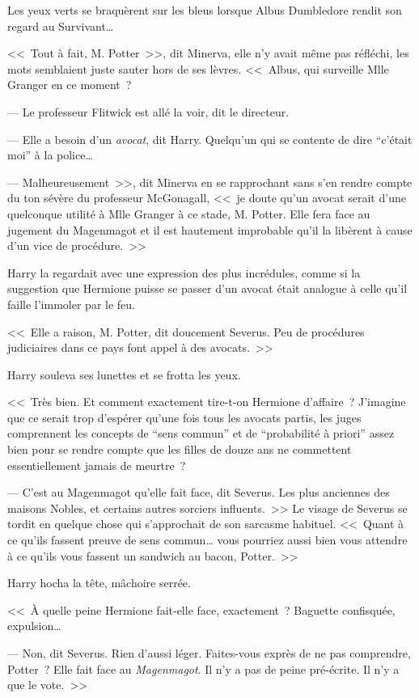 Les yeux verts se braquèrent sur les bleus lorsque Albus Dumbledore rendit son regard au Survivant…

<<~Tout à fait, M. Potter~>>, dit Minerva, elle n'y avait même pas réfléchi, les mots semblaient juste sauter hors de ses lèvres. <<~Albus, qui surveille Mlle Granger en ce moment~?

--- Le professeur Flitwick est allé la voir, dit le directeur.

--- Elle a besoin d'un \emph{avocat}, dit Harry. Quelqu'un qui se contente de dire “c'était moi” à la police…

--- Malheureusement~>>, dit Minerva en se rapprochant sans s'en rendre compte du ton sévère du professeur McGonagall, <<~je doute qu'un avocat serait d'une quelconque utilité à Mlle Granger à ce stade, M. Potter. Elle fera face au jugement du Magenmagot et il est hautement improbable qu'il la libèrent à cause d'un vice de procédure.~>>

Harry la regardait avec une expression des plus incrédules, comme si la suggestion que Hermione puisse se passer d'un avocat était analogue à celle qu'il faille l'immoler par le feu.

<<~Elle a raison, M. Potter, dit doucement Severus. Peu de procédures judiciaires dans ce pays font appel à des avocats.~>>

Harry souleva ses lunettes et se frotta les yeux.

<<~Très bien. Et comment exactement tire-t-on Hermione d'affaire~? J'imagine que ce serait trop d'espérer qu'une fois tous les avocats partis, les juges comprennent les concepts de “sens commun” et de “probabilité à priori” assez bien pour se rendre compte que les filles de douze ans ne commettent essentiellement jamais de meurtre~?

--- C'est au Magenmagot qu'elle fait face, dit Severus. Les plus anciennes des maisons Nobles, et certains autres sorciers influents.~>> Le visage de Severus se tordit en quelque chose qui s'approchait de son sarcasme habituel. <<~Quant à ce qu'ils fassent preuve de sens commun… vous pourriez aussi bien vous attendre à ce qu'ils vous fassent un sandwich au bacon, Potter.~>>

Harry hocha la tête, mâchoire serrée.

<<~À quelle peine Hermione fait-elle face, exactement~? Baguette confisquée, expulsion…

--- Non, dit Severus. Rien d'aussi léger. Faites-vous exprès de ne pas comprendre, Potter~? Elle fait face au \emph{Magenmagot}. Il n'y a pas de peine pré-écrite. Il n'y a que le vote.~>>

